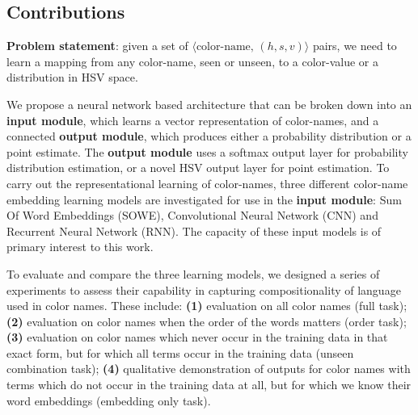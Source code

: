 \documentclass[]{clv3}
\newcommand{\datapairs}{$\langle\text{color-name},\,(h,s,v)\rangle$}
\begin{document}


\subsection{Contributions}
{\bf Problem statement}: given a set of \datapairs{} pairs, we need to learn a mapping from any color-name, seen or unseen, to a color-value or a distribution in HSV space.

We propose a neural network based architecture that can be broken down into an 
\textbf{input module}, which learns a vector representation of color-names,
 and a connected \textbf{output module}, which produces either a probability distribution or a  point estimate.
The \textbf{output module} uses a softmax output layer for probability distribution estimation,
or a novel HSV output layer for point estimation. 
To carry out the representational learning of color-names, three different color-name embedding learning models are investigated for use in the \textbf{input module}: Sum Of Word Embeddings (SOWE), Convolutional Neural Network (CNN) and Recurrent Neural Network (RNN).
The capacity of these input models is of primary interest to this work.

To evaluate and compare the three learning models, we designed a series of experiments to assess their capability in capturing compositionality of language used in color names.
These include:
\textbf{(1)} evaluation on all color names (full task);
\textbf{(2)} evaluation on  color names when the order of the words matters (order task);
\textbf{(3)} evaluation on color names which never occur in the training data in that exact form, but for which all terms occur in the training data (unseen combination task);
\textbf{(4)} qualitative demonstration of outputs for color names with terms which do not occur in the training data at all, but for which we know their word embeddings (embedding only task).
\end{document}
